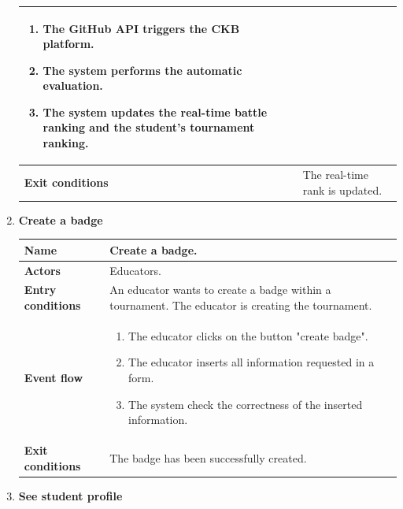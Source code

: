 \begin{enumerate}[label=\textbf{UC.\arabic*}]
\begin{table}[H]
\begin{tabular}{|m{3.2cm}|m{9.8cm}|}
\begin{enumerate}[label=\arabic*.]
                        \item The GitHub API triggers the CKB platform.
                        \item The system performs the automatic evaluation.
                        \item The system updates the real-time battle ranking and the student's tournament ranking.
                    \end{enumerate}\\ 
                    \hline
                    \textbf{Exit conditions}  &  The real-time rank is updated. \\
                    \hline
                \end{tabular}
        \end{table}
        \item {} \textbf{Create a badge}
        \begin{table}[H]
    	    \centering
                \renewcommand{\arraystretch}{1.5}
                \begin{tabular}{|m{3.2cm}|m{9.8cm}|}
                    \hline
                    \textbf{Name} & Create a badge. \\
                    \hline
                    \textbf{Actors} & Educators. \\
                    \hline
                    \textbf{Entry conditions}  & An educator wants to create a badge within a tournament. The educator is creating the tournament. \\
                    \hline
                    \textbf{Event flow}  & 
                    \begin{enumerate}[label=\arabic*.]
                        \item The educator clicks on the button "create badge".
                        \item The educator inserts all information requested in a form.
                        \item The system check the correctness of the inserted information.
                    \end{enumerate}\\ 
                    \hline
                    \textbf{Exit conditions}  & The badge has been successfully created. \\
                    \hline
                \end{tabular}
        \end{table}
        \item {} \textbf{See student profile}

\end{enumerate}
